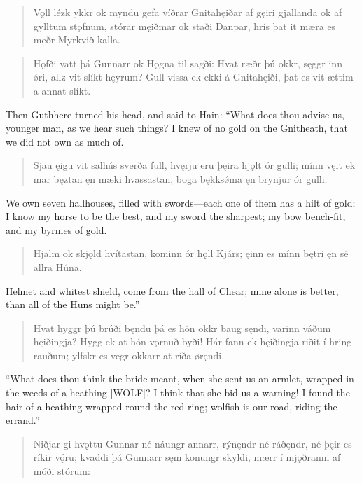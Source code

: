 \begin{verse}
\bva Vǫll lézk ykkr ok myndu gefa \hld víðrar Gnitahęiðar
af gęiri gjallanda \hld ok af gylltum stǫfnum,
stórar męiðmar \hld ok staði Danpar,
hrís þat it mæra \hld es meðr Myrkvið kalla. 
\end{verse}

\begin{verse}
\bva Hǫfði vatt þá Gunnarr \hld ok Hǫgna til sagði:
Hvat ræðr þú okkr, sęggr inn ǿri, \hld allz vit slíkt hęyrum?
Gull vissa ek ekki \hld á Gnitahęiði,
þat es vit ættim-a \hld annat slíkt.
\end{verse}

\bvb Then Guthhere turned his head, and said to Hain: “What does thou advise us, younger man, as we hear such things? I knew of no gold on the Gnitheath, that we did not own as much of.

\begin{verse}
\bva Sjau ęigu vit salhús \hld sverða full,
hvęrju eru þęira \hld hjǫlt ór gulli;
mínn vęit ek mar bęztan \hld ęn mæki hvassastan,
boga bękksǿma \hld ęn brynjur ór gulli. 
\end{verse}

\bvb We own seven hallhouses, filled with swords—each one of them has a hilt of gold; I know my horse to be the best, and my sword the sharpest; my bow bench-fit, and my byrnies of gold.

\begin{verse}
\bva Hjalm ok skjǫld hvítastan, \hld kominn ór hǫll Kjárs;
ęinn es mínn bętri \hld ęn sé allra Húna. 
\end{verse}

\bvb Helmet and whitest shield, come from the hall of Chear; mine alone is better, than all of the Huns might be.”

\begin{verse}
\bva Hvat hyggr þú brúði bęndu \hld þá es hón okkr baug sęndi,
varinn váðum hęiðingja? \hld Hygg ek at hón vǫrnuð byði!
Hár fann ek hęiðingja \hld riðit í hring rauðum;
ylfskr es vegr okkarr \hld at ríða øręndi. 
\end{verse}

\bvb “What does thou think the bride meant, when she sent us an armlet, wrapped in the weeds of a heathing [WOLF]? I think that she bid us a warning! I found the hair of a heathing wrapped round the red ring; wolfish is our road, riding the errand.”

\begin{verse}
\bva Niðjar-gi hvǫttu Gunnar \hld né náungr annarr,
rýnęndr né ráðęndr, \hld né þęir es ríkir vǫ́ru;
kvaddi þá Gunnarr \hld sęm konungr skyldi,
mærr í mjǫðranni \hld af móði stórum: 
\end{verse}

